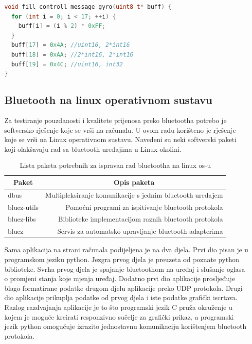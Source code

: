 \documentclass[times, utf8, diplomski]{diplomski}
\begin{document}
\begin{lstlisting}[language=c++, caption={Funkcija koja puni kontrolnu poruku za žiroskopske podatke}, label={codecontroll}]
void fill_controll_message_gyro(uint8_t* buff) {
  for (int i = 0; i < 17; ++i) {
    buff[i] = (i % 2) * 0xFF;
  }
  buff[17] = 0x4A; //uint16, 2*int16
  buff[18] = 0xAA; //2*int16, 2*int16
  buff[19] = 0x4C; //uint16, int32
}
\end{lstlisting}

\subsection{Bluetooth na linux operativnom sustavu}
Za testiranje pouzdanosti i kvalitete prijenosa preko bluetootha potrebo je softversko rješenje koje se vrši na računalu. U ovom radu korišteno je rješenje koje se vrši na Linux operativnom sustavu. Navedeni su neki softverski paketi koji olakšavaju rad sa bluetooth uređajima u Linux okolini.

\begin{table}[H]
  \begin{center}
    \begin{tabular}[c]{l|r}
      \multicolumn{1}{c|}{\textbf{Paket}} & 
      \multicolumn{1}{c}{\textbf{Opis paketa}} \\
      \hline
      dbus & Multipleksiranje komunikacije s jednim bluetooth uređajem \\
      bluez-utils & Pomoćni programi za ispitivanje bluetooth protokola \\
      bluez-libs & Biblioteke implementacijom raznih bluetooth protokola \\
      bluez & Servis za automatsko upravljanje bluetooth adapterima \\
      \hline
    \end{tabular}
  \caption{Lista paketa potrebnih za ispravan rad bluetootha na linux os-u}
  \end{center}
\end{table}

Sama aplikacija na strani računala podijeljena je na dva djela. Prvi dio pisan je u programskom jeziku python. Jezgra prvog djela je preuzeta od poznate python biblioteke\cite{ble-serial}. Svrha prvog djela je spajanje bluetoothom na uređaj i slušanje oglasa o promjeni stanja koje mjenja uređaj. Dodatno prvi dio aplikacije prosljeđuje blago formatirane podatke drugom djelu aplikacije preko UDP protokola\cite{firstPart}. Drugi dio aplikacije prikuplja podatke od prvog djela i iste podatke grafički iscrtava\cite{secondPart}. Razlog razdvajanja aplikacije je to što programski jezik C pruža okruženje u kojem je moguće kreirati responzivno sučelje za grafički prikaz, a programski jezik python omogućuje izrazito jednostavnu komunikaciju korištenjem bluetooth protokola.
\end{document}
